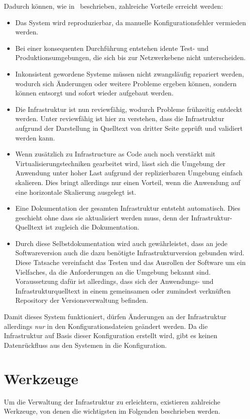 Dadurch können, wie in~\autocite[64\psqq]{Wolff201604} beschrieben, zahlreiche Vorteile erreicht werden:
\begin{itemize}
    \item Das System wird reproduzierbar, da manuelle Konfigurationsfehler vermieden werden.
    \item Bei einer konsequenten Durchführung entstehen idente Test- und Produktionsumgebungen, die sich bis zur Netzwerkebene nicht unterscheiden.
    \item Inkonsistent gewordene Systeme müssen nicht zwangsläufig repariert werden, wodurch sich Änderungen oder weitere Probleme ergeben können, sondern können entsorgt und sofort wieder aufgebaut werden.
    \item Die Infrastruktur ist nun reviewfähig, wodurch Probleme frühzeitig entdeckt werden. Unter reviewfähig ist hier zu verstehen, dass die Infrastruktur aufgrund der Darstellung in Quelltext von dritter Seite geprüft und validiert werden kann.
    \item Wenn zusätzlich zu Infrastructure as Code auch noch verstärkt mit Virtualisierungstechniken gearbeitet wird, lässt sich die Umgebung der Anwendung unter hoher Last aufgrund der replizierbaren Umgebung einfach skalieren. Dies bringt allerdings nur einen Vorteil, wenn die Anwendung auf eine horizontale Skalierung ausgelegt ist.
    \item Eine Dokumentation der gesamten Infrastruktur entsteht automatisch. Dies geschieht ohne dass sie aktualisiert werden muss, denn der Infrastruktur-Quelltext ist zugleich die Dokumentation.
    \item Durch diese Selbstdokumentation wird auch gewährleistet, dass an jede Softwareversion auch die dazu benötigte Infrastrukturversion gebunden wird. Diese Tatsache vereinfacht das Testen und das Ausrollen der Software um ein Vielfaches, da die Anforderungen an die Umgebung bekannt sind. Voraussetzung dafür ist allerdings, dass sich der Anwendungs- und Infrastrukturquelltext in einem gemeinsamen oder zumindest verknüften Repository der Versionsverwaltung befinden.
\end{itemize}
Damit dieses System funktioniert, dürfen Änderungen an der Infrastruktur allerdings \emph{nur} in den Konfigurationsdateien geändert werden. Da die Infrastruktur auf Basis dieser Konfiguration erstellt wird, gibt es keinen Datenrückfluss aus den Systemen in die Konfiguration.


\section{Werkzeuge}
\label{sec:konfigurationswerkzeuge}
Um die Verwaltung der Infrastruktur zu erleichtern, existieren zahlreiche Werkzeuge, von denen die wichtigsten im Folgenden beschrieben werden.

